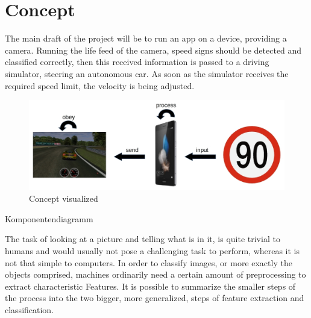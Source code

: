 \chapter{Concept}\label{chapter:Concept}
The main draft of the project will be to run an app on a device, providing a camera. Running the life feed of the camera, speed signs should be detected and classified correctly, then this received information is passed to a driving simulator, steering an autonomous car. As soon as the simulator receives the required speed limit, the velocity is being adjusted. 

\begin{figure}[H]
	\includegraphics[width=\linewidth]{images/concept.jpg}
	\caption{Concept visualized}
\end{figure}

Komponentendiagramm\newline

The task of looking at a picture and telling what is in it, is quite trivial to humans and would usually not pose a challenging task to perform, whereas it is not that simple to computers. In order to classify images, or more exactly the objects comprised, machines ordinarily need a certain amount of preprocessing to extract characteristic Features. It is possible to summarize the smaller steps of the process into the two bigger, more generalized, steps of feature extraction and classification.



